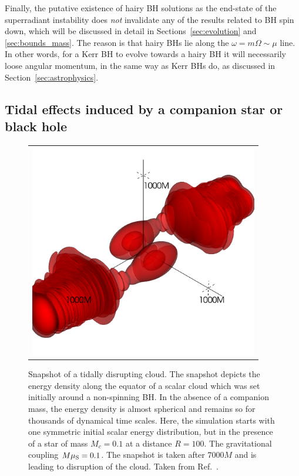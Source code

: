 \documentclass[11pt]{article}
\numberwithin{equation}{section} %
\begin{document}
Finally, the putative existence of hairy BH solutions as the end-state of the superradiant instability does {\it not} 
invalidate
any of the results related to BH spin down, which will be discussed in detail in Sections~\ref{sec:evolution} and \ref{sec:bounds_mass}. The reason is that hairy BHs lie 
along the $\omega=m\Omega\sim\mu$ line.
In other words, for a Kerr BH to evolve towards a hairy BH it will necessarily loose angular momentum, in the same way 
as Kerr BHs do, as discussed in Section~\ref{sec:astrophysics}.

\subsection{Tidal effects induced by a companion star or black hole}\label{sec:cloud_tides}
%
\begin{figure}[htb]
\begin{center}
\begin{tabular}{c}
\includegraphics[width=10cm]{rho_Mc01_a0_mu01.png}
\end{tabular}
\caption{Snapshot of a tidally disrupting cloud. The snapshot depicts the energy density along the equator of a scalar 
cloud which was set initially around a non-spinning BH. 
In the absence of a companion mass, the energy density is almost spherical and remains so for thousands of dynamical 
time scales. Here, the simulation starts with one symmetric initial scalar energy distribution, but in the presence of a star
of mass $M_c=0.1$ at a distance $R=100$. The gravitational coupling $M\mu_{\rm S}=0.1$.
The snapshot is taken after $7000M$ and is leading to disruption of the cloud. Taken from Ref.~\cite{Cardoso:2020hca}.
\label{fig:a0_Mc01_mu01_snapshot}}
\end{center}
\end{figure}
\end{document}
